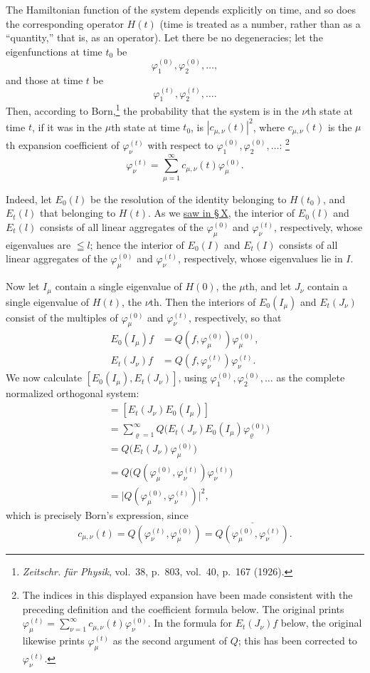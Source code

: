 \documentclass[fontsize=13pt,paper=b5,twoside,bookmarkpackage=false]{scrartcl}
\newcounter{translatornote}
\newcommand{\tnote}[1]{%
  \begingroup\stepcounter{translatornote}%
  \renewcommand{\thefootnote}{T\arabic{translatornote}}%
  \footnote[0]{#1}\endgroup}
\begin{document}
The Hamiltonian function of the system depends explicitly on time, and so does the corresponding operator $H(t)$ (time is treated as a number, rather than as a ``quantity,'' that is, as an operator). Let there be no degeneracies; let the eigenfunctions at time $t_0$ be
\[
 \varphi_1^{(0)},\varphi_2^{(0)},\ldots,
\]
and those at time $t$ be
\[
 \varphi_1^{(t)},\varphi_2^{(t)},\ldots.
\]
Then, according to Born,\footnote[36]{\label{fn:36}\emph{Zeitschr. f\"ur Physik}, vol.~38, p.~803, vol.~40, p.~167 (1926).} the probability that the system is in the $\nu$th state at time $t$, if it was in the $\mu$th state at time $t_0$, is $|c_{\mu,\nu}(t)|^2$, where $c_{\mu,\nu}(t)$ is the $\mu$th expansion coefficient of $\varphi_\nu^{(t)}$ with respect to $\varphi_1^{(0)},\varphi_2^{(0)},\ldots$:\tnote{The indices in this displayed expansion have been made consistent with the preceding definition and the coefficient formula below. The original prints $\varphi_\mu^{(t)}=\sum_{\nu=1}^{\infty}c_{\mu,\nu}(t)\varphi_\nu^{(0)}$. In the formula for $E_t(J_\nu)f$ below, the original likewise prints $\varphi_\mu^{(t)}$ as the second argument of $Q$; this has been corrected to $\varphi_\nu^{(t)}$.}
\[
 \varphi_\nu^{(t)}=\sum_{\mu=1}^{\infty}c_{\mu,\nu}(t)\varphi_\mu^{(0)}.
\]

Indeed, let $E_0(l)$ be the resolution of the identity belonging to $H(t_0)$, and $E_t(l)$ that belonging to $H(t)$. As we \hyperref[eq:X:point-projection]{saw in \S\,X}, the interior of $E_0(l)$ and $E_t(l)$ consists of all linear aggregates of the $\varphi_\mu^{(0)}$ and $\varphi_\nu^{(t)}$, respectively, whose eigenvalues are $\leqq l$; hence the interior of $E_0(I)$ and $E_t(I)$ consists of all linear aggregates of the $\varphi_\mu^{(0)}$ and $\varphi_\nu^{(t)}$, respectively, whose eigenvalues lie in $I$.

Now let $I_\mu$ contain a single eigenvalue of $H(0)$, the $\mu$th, and let $J_\nu$ contain a single eigenvalue of $H(t)$, the $\nu$th. Then the interiors of $E_0(I_\mu)$ and $E_t(J_\nu)$ consist of the multiples of $\varphi_\mu^{(0)}$ and $\varphi_\nu^{(t)}$, respectively, so that
\begin{align*}
 E_0(I_\mu)f&=Q(f,\varphi_\mu^{(0)})\varphi_\mu^{(0)},\\
 E_t(J_\nu)f&=Q(f,\varphi_\nu^{(t)})\varphi_\nu^{(t)}.
\end{align*}
We now calculate $[E_0(I_\mu),E_t(J_\nu)]$, using $\varphi_1^{(0)},\varphi_2^{(0)},\ldots$ as the complete normalized orthogonal system:
\begin{align*}
 [E_0(I_\mu),E_t(J_\nu)]
 &=[E_t(J_\nu)E_0(I_\mu)]\\
 &=\sum_{\varrho=1}^{\infty}Q\bigl(E_t(J_\nu)E_0(I_\mu)\varphi_\varrho^{(0)}\bigr)\\
 &=Q\bigl(E_t(J_\nu)\varphi_\mu^{(0)}\bigr)\\
 &=Q\bigl(Q(\varphi_\mu^{(0)},\varphi_\nu^{(t)})\varphi_\nu^{(t)}\bigr)\\
 &=\bigl|Q(\varphi_\mu^{(0)},\varphi_\nu^{(t)})\bigr|^2,
\end{align*}
which is precisely Born's expression, since
\[
 c_{\mu,\nu}(t)=Q(\varphi_\nu^{(t)},\varphi_\mu^{(0)})
 =\overline{Q(\varphi_\mu^{(0)},\varphi_\nu^{(t)})}.
\]
\end{document}
